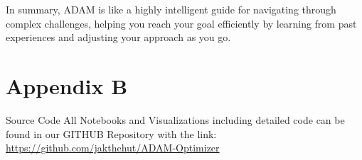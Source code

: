 \documentclass[journal]{IEEEtran}
\begin{document}
In summary, ADAM is like a highly intelligent guide for navigating through complex challenges, helping you reach your goal efficiently by learning from past experiences and adjusting your approach as you go.

\section{Appendix B}
\centering Source Code
All Notebooks and Visualizations including detailed code can be found in our GITHUB Repository with the link: \href{https://github.com/jakthehut/ADAM-Optimizer}{https://github.com/jakthehut/ADAM-Optimizer}
\end{document}
